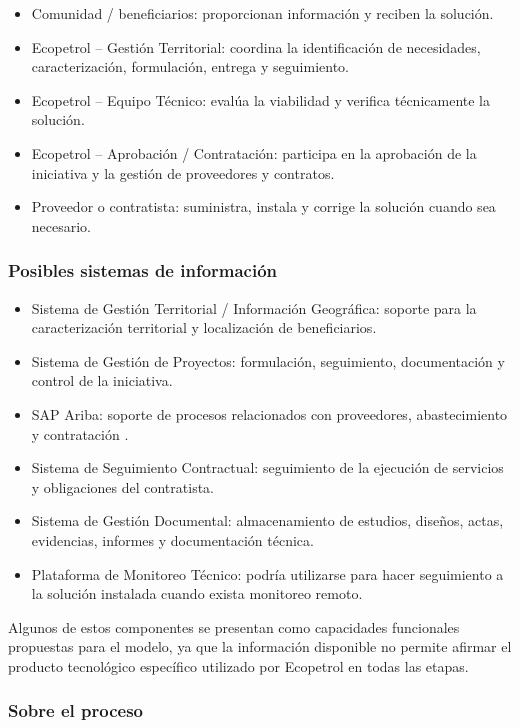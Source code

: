\begin{itemize}
    \item Comunidad / beneficiarios: proporcionan información y reciben la solución.
    \item Ecopetrol – Gestión Territorial: coordina la identificación de necesidades, caracterización, formulación, entrega y seguimiento.
    \item Ecopetrol – Equipo Técnico: evalúa la viabilidad y verifica técnicamente la solución.
    \item Ecopetrol – Aprobación / Contratación: participa en la aprobación de la iniciativa y la gestión de proveedores y contratos.
    \item Proveedor o contratista: suministra, instala y corrige la solución cuando sea necesario.
\end{itemize}

\subsubsection*{Posibles sistemas de información}

\begin{itemize}
    \item Sistema de Gestión Territorial / Información Geográfica: soporte para la caracterización territorial y localización de beneficiarios.
    \item Sistema de Gestión de Proyectos: formulación, seguimiento, documentación y control de la iniciativa.
    \item SAP Ariba: soporte de procesos relacionados con proveedores, abastecimiento y contratación \parencite{ecopetrolAriba}.
    \item Sistema de Seguimiento Contractual: seguimiento de la ejecución de servicios y obligaciones del contratista.
    \item Sistema de Gestión Documental: almacenamiento de estudios, diseños, actas, evidencias, informes y documentación técnica.
    \item Plataforma de Monitoreo Técnico: podría utilizarse para hacer seguimiento a la solución instalada cuando exista monitoreo remoto.
\end{itemize}

Algunos de estos componentes se presentan como capacidades funcionales propuestas para el modelo, ya que la información disponible no permite afirmar el producto tecnológico específico utilizado por Ecopetrol en todas las etapas.

\subsubsection*{Sobre el proceso}

